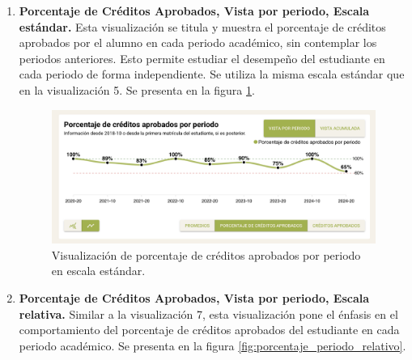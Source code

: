 \begin{enumerate}
	\item \textbf{Porcentaje de Créditos Aprobados, Vista por periodo, Escala estándar.} Esta visualización se titula  y muestra el porcentaje de créditos aprobados por el alumno en cada periodo académico, sin contemplar los periodos anteriores. Esto permite estudiar el desempeño del estudiante en cada periodo de forma independiente. Se utiliza la misma escala estándar que en la visualización 5. Se presenta en la figura \ref{fig:porcentaje_periodo_estandar}.

	      \begin{figure}[H]
		      \noindent
		      \hspace{\leftmargin}
		      \begin{minipage}{\dimexpr\linewidth-\leftmargin\relax}
			      \includegraphics[width=\linewidth]{assets/nes/porcentaje_periodo_estandar.png}
			      \caption{Visualización de porcentaje de créditos aprobados por periodo en escala estándar.}
			      \label{fig:porcentaje_periodo_estandar}
		      \end{minipage}
	      \end{figure}

	\item \textbf{Porcentaje de Créditos Aprobados, Vista por periodo, Escala relativa.} Similar a la visualización 7, esta visualización pone el énfasis en el comportamiento del porcentaje de créditos aprobados del estudiante en cada periodo académico. Se presenta en la figura \ref{fig:porcentaje_periodo_relativo}.


\end{enumerate}
